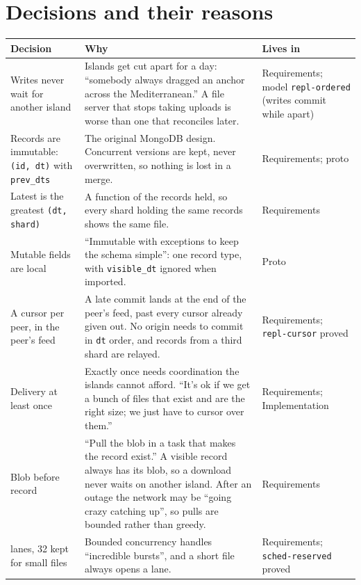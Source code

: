 \section{Decisions and their reasons}
\begin{longtable}{>{\raggedright}p{}>{\raggedright}p{}>{\raggedright\arraybackslash}p{}}
\toprule
Decision & Why & Lives in\\
\midrule
\endhead
Writes never wait for another island & Islands get cut apart for a day: ``somebody
always dragged an anchor across the Mediterranean.'' A file server that stops
taking uploads is worse than one that reconciles later. & Requirements; model
\texttt{repl-ordered} (writes commit while apart)\\
\addlinespace
Records are immutable: \texttt{(id, dt)} with \texttt{prev\_dts} & The original
MongoDB design. Concurrent versions are kept, never overwritten, so nothing is lost
in a merge. & Requirements; proto\\
\addlinespace
Latest is the greatest \texttt{(dt, shard)} & A function of the records held, so
every shard holding the same records shows the same file. & Requirements\\
\addlinespace
Mutable fields are local & ``Immutable with exceptions to keep the schema
simple'': one record type, with \texttt{visible\_dt} ignored when imported. &
Proto\\
\addlinespace
A cursor per peer, in the peer's feed & A late commit lands at the end of the
peer's feed, past every cursor already given out. No origin needs to commit in
\texttt{dt} order, and records from a third shard are relayed. & Requirements;
\texttt{repl-cursor} proved\\
\addlinespace
Delivery at least once & Exactly once needs coordination the islands cannot
afford. ``It's ok if we get a bunch of files that exist and are the right size; we
just have to cursor over them.'' & Requirements; Implementation\\
\addlinespace
Blob before record & ``Pull the blob in a task that makes the record exist.'' A
visible record always has its blob, so a download never waits on another island.
After an outage the network may be ``going crazy catching up'', so pulls are
bounded rather than greedy. & Requirements\\
\addlinespace
128 lanes, 32 kept for small files & Bounded concurrency handles ``incredible
bursts'', and a short file always opens a lane. & Requirements;
\texttt{sched-reserved} proved\\

\end{longtable}
